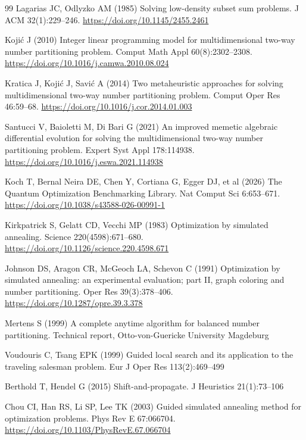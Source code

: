 \documentclass[pdflatex,sn-mathphys-num]{sn-jnl}
\theoremstyle{thmstyleone}
\theoremstyle{thmstylethree}
\begin{document}
\begin{thebibliography}{99}
Lagarias JC, Odlyzko AM (1985) Solving low-density subset sum problems. J ACM 32(1):229--246. \url{https://doi.org/10.1145/2455.2461}

\label{B:kojic2010}
Koji\'c J (2010) Integer linear programming model for multidimensional two-way number partitioning problem. Comput Math Appl 60(8):2302--2308. \url{https://doi.org/10.1016/j.camwa.2010.08.024}

Kratica J, Koji\'c J, Savi\'c A (2014) Two metaheuristic approaches for solving multidimensional two-way number partitioning problem. Comput Oper Res 46:59--68. \url{https://doi.org/10.1016/j.cor.2014.01.003}

\label{B:santucci2021}
Santucci V, Baioletti M, Di Bari G (2021) An improved memetic algebraic differential evolution for solving the multidimensional two-way number partitioning problem. Expert Syst Appl 178:114938. \url{https://doi.org/10.1016/j.eswa.2021.114938}

Koch T, Bernal Neira DE, Chen Y, Cortiana G, Egger DJ, et al (2026) The Quantum Optimization Benchmarking Library. Nat Comput Sci 6:653--671. \url{https://doi.org/10.1038/s43588-026-00991-1}

Kirkpatrick S, Gelatt CD, Vecchi MP (1983) Optimization by simulated annealing. Science 220(4598):671--680. \url{https://doi.org/10.1126/science.220.4598.671}

Johnson DS, Aragon CR, McGeoch LA, Schevon C (1991) Optimization by simulated annealing: an experimental evaluation; part II, graph coloring and number partitioning. Oper Res 39(3):378--406. \url{https://doi.org/10.1287/opre.39.3.378}

Mertens S (1999) A complete anytime algorithm for balanced number partitioning. Technical report, Otto-von-Guericke University Magdeburg

Voudouris C, Tsang EPK (1999) Guided local search and its application to the traveling salesman problem. Eur J Oper Res 113(2):469--499

Berthold T, Hendel G (2015) Shift-and-propagate. J Heuristics 21(1):73--106

\label{B:chou2003}
Chou CI, Han RS, Li SP, Lee TK (2003) Guided simulated annealing method for optimization problems. Phys Rev E 67:066704. \url{https://doi.org/10.1103/PhysRevE.67.066704}


\end{thebibliography}
\end{document}
